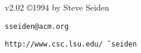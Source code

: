 \centerline{v2.02 \copyright 1994 by Steve Seiden}
\centerline{\tt sseiden@acm.org}
\centerline{\tt http://www.csc.lsu.edu/\~{\ }\hskip -6pt seiden}
